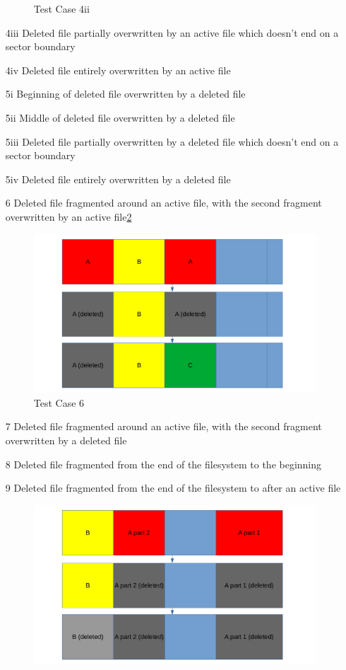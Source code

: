 \begin{itemize}
\begin{figure}[h]
        \caption{Test Case 4ii}
        \label{fig:case_4ii}
    \end{figure}
    \item [4iii] Deleted file partially overwritten by an active file which doesn't end on a sector boundary
    \item [4iv] Deleted file entirely overwritten by an active file
    \item [5i] Beginning of deleted file overwritten by a deleted file
    \item [5ii] Middle of deleted file overwritten by a deleted file
    \item [5iii] Deleted file partially overwritten by a deleted file which doesn't end on a sector boundary
    \item [5iv] Deleted file entirely overwritten by a deleted file
    \item [6] Deleted file fragmented around an active file, with the second fragment overwritten by an active file\ref{fig:case_6}
    \begin{figure}[h]
        \centering
        \includegraphics[width=\linewidth]{fig/case6.png}
        \caption{Test Case 6}
        \label{fig:case_6}
    \end{figure}
    \item [7] Deleted file fragmented around an active file, with the second fragment overwritten by a deleted file
    \item [8] Deleted file fragmented from the end of the filesystem to the beginning
    \item [9] Deleted file fragmented from the end of the filesystem to after an active file
    \begin{figure}[h]
        \centering
        \includegraphics[width=\linewidth]{fig/case10.png}

\end{figure}
\end{itemize}
